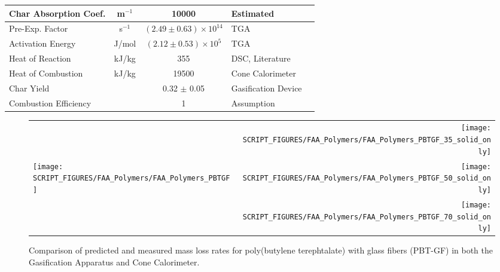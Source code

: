 \begin{table}[h!]
\begin{center}
\begin{tabular}{|l|c|c|l|l|}
Char Absorption Coef.   &      m$^{-1}$ &       10000                       & Estimated                                 & \cite{Kempel:1}               \\ \hline
Pre-Exp. Factor         &      s$^{-1}$ & $(2.49 \pm 0.63) \times 10^{14}$  & TGA                                       & \cite{Kempel:1}               \\ \hline
Activation Energy       &    J/mol    & $(2.12 \pm 0.53) \times 10^{5}$   & TGA                                       & \cite{Kempel:1}               \\ \hline
Heat of Reaction        &      kJ/kg    &        355                        & DSC, Literature                           & \cite{Kempel:1,Lyon:Ency2005} \\ \hline
Heat of Combustion      &      kJ/kg    & 19500                             & Cone Calorimeter                          & \cite{Kempel:1}               \\ \hline
Char Yield              &               & 0.32 $\pm$ 0.05                   & Gasification Device                       & \cite{Kempel:1}               \\ \hline
Combustion Efficiency   &               &          1                        & Assumption                                & \cite{Kempel:1}               \\ \hline
\end{tabular}
\end{center}
\label{Properties_PBT-GF}
\end{table}

\begin{figure}[h!]
\begin{tabular*}{\textwidth}{l@{\extracolsep{\fill}}r}
 &
\texttt{[image: SCRIPT\_FIGURES/FAA\_Polymers/FAA\_Polymers\_PBTGF\_35\_solid\_only]} \\
\texttt{[image: SCRIPT\_FIGURES/FAA\_Polymers/FAA\_Polymers\_PBTGF]} &
\texttt{[image: SCRIPT\_FIGURES/FAA\_Polymers/FAA\_Polymers\_PBTGF\_50\_solid\_only]} \\
 &
\texttt{[image: SCRIPT\_FIGURES/FAA\_Polymers/FAA\_Polymers\_PBTGF\_70\_solid\_only]}
\end{tabular*}
\caption[Mass loss rate of poly(butylene terephtalate) with glass fibers (PBT-GF).]
{Comparison of predicted and measured mass loss rates for poly(butylene terephtalate) with glass fibers (PBT-GF) in both the Gasification Apparatus and Cone Calorimeter.}
\label{HRR_PBTGF}
\end{figure}

